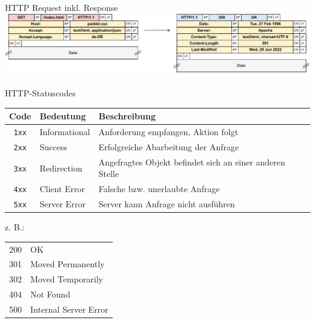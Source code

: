 \begin{example}{HTTP Request inkl. Response}
    \includegraphics[width=\textwidth]{includes/figures/example_http_header.pdf}
\end{example}

\begin{bonus}{HTTP-Statuscodes}
    \begin{center}
        \begin{tabular}{|c|l|l|}
            \hline
            Code         & Bedeutung     & Beschreibung                                             \\\hline\hline
            \texttt{1xx} & Informational & Anforderung empfangen, Aktion folgt                      \\\hline
            \texttt{2xx} & Success       & Erfolgreiche Abarbeitung der Anfrage                     \\\hline
            \texttt{3xx} & Redirection   & Angefragtes Objekt befindet sich an einer anderen Stelle \\\hline
            \texttt{4xx} & Client Error  & Falsche bzw. unerlaubte Anfrage                          \\\hline
            \texttt{5xx} & Server Error  & Server kann Anfrage nicht ausführen                      \\\hline
        \end{tabular}
    \end{center}

    z. B.:

    \begin{tabular}{Tl}
        200 & OK                    \\
        301 & Moved Permanently     \\
        302 & Moved Temporarily     \\
        404 & Not Found             \\
        500 & Internal Server Error \\
    \end{tabular}
\end{bonus}

